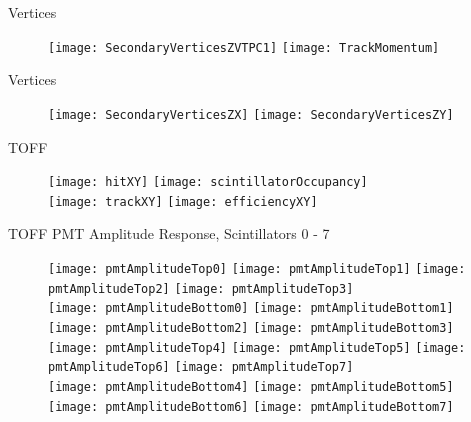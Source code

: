 \documentclass[11pt]{beamer}
\begin{document}
\begin{frame}{Vertices}
\begin{figure}
\centering
\texttt{[image: SecondaryVerticesZVTPC1]}
\texttt{[image: TrackMomentum]}
\end{figure}
\end{frame}

\begin{frame}{Vertices}
\begin{figure}
\centering
\texttt{[image: SecondaryVerticesZX]}
\texttt{[image: SecondaryVerticesZY]}
\end{figure}
\end{frame}

\begin{frame}{TOFF}
\begin{figure}
\centering
\texttt{[image: hitXY]}
\texttt{[image: scintillatorOccupancy]} \\
\texttt{[image: trackXY]}
\texttt{[image: efficiencyXY]}
\end{figure}
\end{frame}

\begin{frame}{TOFF PMT Amplitude Response, Scintillators 0 - 7}
\begin{figure}
\centering
\texttt{[image: pmtAmplitudeTop0]}
\texttt{[image: pmtAmplitudeTop1]}
\texttt{[image: pmtAmplitudeTop2]}
\texttt{[image: pmtAmplitudeTop3]} \\ 
\texttt{[image: pmtAmplitudeBottom0]}
\texttt{[image: pmtAmplitudeBottom1]}
\texttt{[image: pmtAmplitudeBottom2]}
\texttt{[image: pmtAmplitudeBottom3]} \\
\texttt{[image: pmtAmplitudeTop4]}
\texttt{[image: pmtAmplitudeTop5]}
\texttt{[image: pmtAmplitudeTop6]}
\texttt{[image: pmtAmplitudeTop7]} \\
\texttt{[image: pmtAmplitudeBottom4]}
\texttt{[image: pmtAmplitudeBottom5]}
\texttt{[image: pmtAmplitudeBottom6]}
\texttt{[image: pmtAmplitudeBottom7]} \\
\end{figure}
\end{frame}
\end{document}
